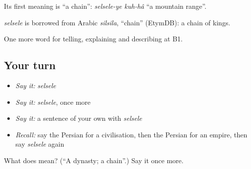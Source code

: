 Its first meaning is \textquotedblleft{}a chain\textquotedblright{}: \emph{selsele-ye kuh-hâ} \textquotedblleft{}a mountain range\textquotedblright{}.

\begin{cousinweb}
\emph{selsele} is borrowed from Arabic \emph{silsila}, \textquotedblleft{}chain\textquotedblright{} (EtymDB): a chain of kings.
\end{cousinweb}

\begin{grammarlens}[title={What you've built}]
One more word for telling, explaining and describing at B1.
\end{grammarlens}

\subsection*{Your turn}
\begin{itemize}
\raggedright
  \item \emph{Say it:} \emph{selsele}
  \item \emph{Say it:} \emph{selsele}, once more
  \item \emph{Say it:} a sentence of your own with \emph{selsele}
  \item \emph{Recall:} say the Persian for a civilisation, then the Persian for an empire, then say \emph{selsele} again
\end{itemize}

\begin{tcolorbox}[breakable,colback=teal!4,colframe=teal!35!black,title={Before you move on}]
What does  mean? (\textquotedblleft{}A dynasty; a chain\textquotedblright{}.) Say it once more.
\end{tcolorbox}
